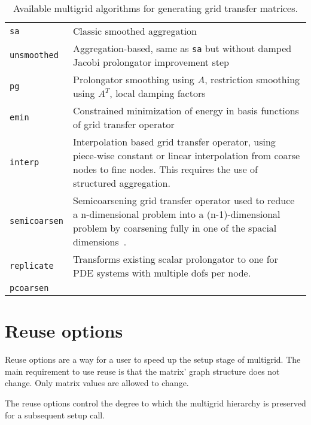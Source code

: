 \begin{table}[H]
  \begin{center}
    \begin{tabular}{p{3.5cm} p{11cm}}
      \toprule
      \verb!sa!          & Classic smoothed aggregation~\cite{VMB1996} \\
      \verb!unsmoothed!  & Aggregation-based, same as \verb!sa! but without damped Jacobi prolongator improvement step \\
      \verb!pg!          & Prolongator smoothing using $A$, restriction smoothing using $A^T$, local damping factors~\cite{ST2008} \\
      \verb!emin!        & Constrained minimization of energy in basis functions of grid transfer operator~\cite{WTWG2014,OST2011} \\
      \verb!interp!      & Interpolation based grid transfer operator, using piece-wise constant or linear interpolation from coarse nodes to fine nodes. This requires the use of structured aggregation.\\
      \verb!semicoarsen! & Semicoarsening grid transfer operator used to reduce a n-dimensional problem into a (n-1)-dimensional problem by coarsening fully in one of the spacial dimensions~\cite{TPSTP2015}.\\
      \verb!replicate!      & Transforms existing scalar prolongator to one  for PDE systems with multiple dofs per node.\\
      \verb!pcoarsen!    & \\
      \bottomrule
    \end{tabular}
    \caption{Available multigrid algorithms for generating grid transfer matrices. }
\label{t:mgs}
  \end{center}
\end{table}



\section{Reuse options}
\label{sec:options_reuse}

Reuse options are a way for a user to speed up the setup stage of multigrid.
The main requirement to use reuse is that the matrix' graph structure does not
change. Only matrix values are allowed to change.

The reuse options control the degree to which the multigrid hierarchy is preserved
for a subsequent setup call.

